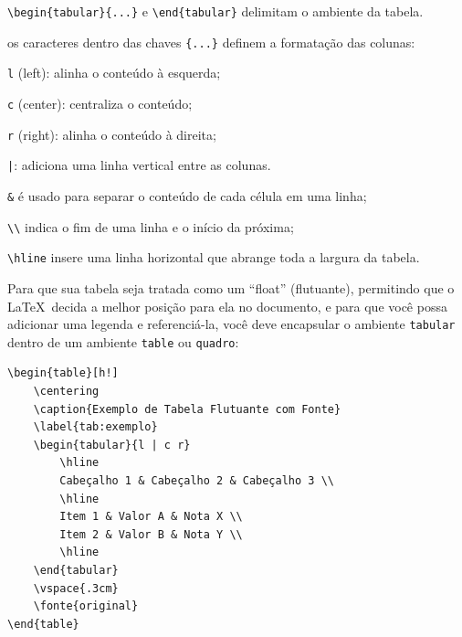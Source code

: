 \begin{alineas}
	\item \texttt{\textbackslash begin\{tabular\}\{...\}} e \texttt{\textbackslash end\{tabular\}} delimitam o ambiente da tabela.
	\item os caracteres dentro das chaves \texttt{\{...\}} definem a formatação das colunas:
	\begin{alineas}
		\item \texttt{l} (left): alinha o conteúdo à esquerda;
		\item \texttt{c} (center): centraliza o conteúdo;
		\item \texttt{r} (right): alinha o conteúdo à direita;
		\item \texttt{|}: adiciona uma linha vertical entre as colunas.
	\end{alineas}
	\item \texttt{\&} é usado para separar o conteúdo de cada célula em uma linha;
	\item \texttt{\textbackslash\textbackslash} indica o fim de uma linha e o início da próxima;
	\item \texttt{\textbackslash hline} insere uma linha horizontal que abrange toda a largura da tabela.
\end{alineas}

\vspace{\baselineskip}

Para que sua tabela seja tratada como um ``float'' (flutuante), permitindo que o \LaTeX\  decida a melhor posição para ela no documento, e para que você possa adicionar uma legenda e referenciá-la, você deve encapsular o ambiente \texttt{tabular} dentro de um ambiente \texttt{table} ou \texttt{quadro}:

\begin{lstlisting}[language={[LaTeX]TeX}]
\begin{table}[h!]
	\centering
	\caption{Exemplo de Tabela Flutuante com Fonte}
	\label{tab:exemplo}
	\begin{tabular}{l | c r}
		\hline
		Cabeçalho 1 & Cabeçalho 2 & Cabeçalho 3 \\
		\hline
		Item 1 & Valor A & Nota X \\
		Item 2 & Valor B & Nota Y \\
		\hline
	\end{tabular}
	\vspace{.3cm}
	\fonte{original}
\end{table}
\end{lstlisting}

